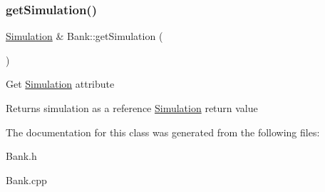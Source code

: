 \subsubsection{\texorpdfstring{get\+Simulation()}{getSimulation()}}
{\footnotesize\ttfamily \hyperlink{classSimulation}{Simulation} \& Bank\+::get\+Simulation (\begin{DoxyParamCaption}{ }\end{DoxyParamCaption})}

Get \hyperlink{classSimulation}{Simulation} attribute \begin{DoxyReturn}{Returns}
simulation as a reference \hyperlink{classSimulation}{Simulation} return value 
\end{DoxyReturn}


The documentation for this class was generated from the following files\+:\begin{DoxyCompactItemize}
\item 
Bank.\+h\item 
Bank.\+cpp\end{DoxyCompactItemize}
